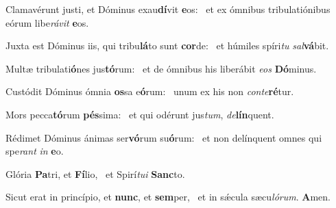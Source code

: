 \item Clamavérunt justi, et Dóminus exau\textbf{dí}vit \textbf{e}os:~\psstar{} et ex ómnibus tribulatiónibus eórum libe\textit{rávit} \textbf{e}os.
\item Juxta est Dóminus iis, qui tribu\textbf{lá}to sunt \textbf{cor}de:~\psstar{} et húmiles spíri\textit{tu} \textit{sal}\textbf{vá}bit.
\item Multæ tribulati\textbf{ó}nes jus\textbf{tó}\-rum:~\psstar{} et de ómnibus his liberábit \textit{eos} \textbf{Dó}minus.
\item Custódit Dóminus ómnia \textbf{os}sa e\textbf{ó}rum:~\psstar{} unum ex his non \textit{conte}\textbf{ré}tur.
\item Mors pecca\textbf{tó}rum \textbf{pés}sima:~\psstar{} et qui odérunt jus\textit{tum}, \textit{de}\textbf{lín}quent.
\item Rédimet Dóminus ánimas ser\textbf{vó}rum su\textbf{ó}rum:~\psstar{} et non delínquent omnes qui spe\textit{rant} \textit{in} \textbf{e}o.
\item Glória \textbf{Pa}tri, et \textbf{Fí}lio,~\psstar{} et Spirí\textit{tui} \textbf{Sanc}to.
\item Sicut erat in princípio, et \textbf{nunc}, et \textbf{sem}per,~\psstar{} et in sǽcula sæcu\textit{lórum}. \textbf{A}men.
